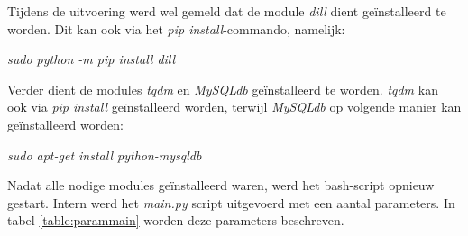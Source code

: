 Tijdens de uitvoering werd wel gemeld dat de module \textit{dill} dient geïnstalleerd te worden. Dit kan ook via het \textit{pip install}-commando, namelijk:

\begin{center}
	\textit{sudo python -m pip install dill}
\end{center}

Verder dient de modules \textit{tqdm} en \textit{MySQLdb} geïnstalleerd te worden. \textit{tqdm} kan ook via \textit{pip install} geïnstalleerd worden, terwijl \textit{MySQLdb} op volgende manier kan geïnstalleerd worden:

\begin{center}
	\textit{sudo apt-get install python-mysqldb}
\end{center}

Nadat alle nodige modules geïnstalleerd waren, werd het bash-script opnieuw gestart. Intern werd het \textit{main.py} script uitgevoerd met een aantal parameters. In tabel \ref{table:parammain} worden deze parameters beschreven.

